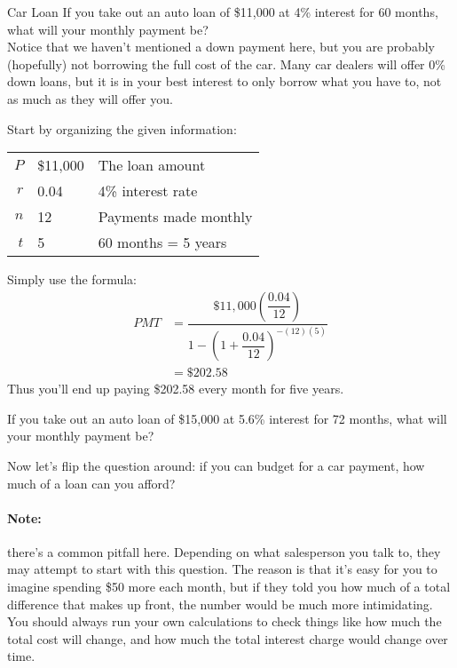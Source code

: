 \begin{example}[https://www.youtube.com/watch?v=RVUWTbil3fQ]{Car Loan}
If you take out an auto loan of \$11,000 at 4\% interest for 60 months, what will your monthly payment be?\\

\sol
Notice that we haven't mentioned a down payment here, but you are probably (hopefully) not borrowing the full cost of the car.  Many car dealers will offer 0\% down loans, but it is in your best interest to only borrow what you have to, not as much as they will offer you.

Start by organizing the given information:
\begin{center}
\begin{tabular}{r l l}
$P$ & \$11,000 & The loan amount\\
$r$ & 0.04 & 4\% interest rate\\
$n$ & 12 & Payments made monthly\\
$t$ & 5 & 60 months = 5 years
\end{tabular}
\end{center}

Simply use the formula:
\begin{align*}
PMT &= \dfrac{\$11,000\left(\dfrac{0.04}{12}\right)}{1-\left(1+\dfrac{0.04}{12}\right)^{-(12)(5)}}\\
&= \boxed{\$202.58}
\end{align*}
Thus you'll end up paying \$202.58 every month for five years.
\end{example}

\begin{try}
If you take out an auto loan of \$15,000 at 5.6\% interest for 72 months, what will your monthly payment be?
\end{try}

Now let's flip the question around: if you can budget for a car payment, how much of a loan can you afford?

\paragraph{Note:} there's a common pitfall here.  Depending on what salesperson you talk to, they may attempt to start with this question.  The reason is that it's easy for you to imagine spending \$50 more each month, but if they told you how much of a total difference that makes up front, the number would be much more intimidating.  You should always run your own calculations to check things like how much the total cost will change, and how much the total interest charge would change over time.
\pagebreak

